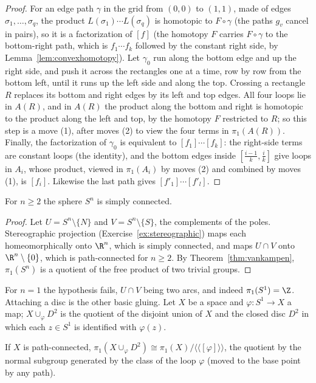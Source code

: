 \begin{proof}
For an edge path $\gamma$ in the grid from $(0,0)$ to $(1,1)$, made of edges $\sigma_1,\dots,\sigma_q$, the product $L(\sigma_1)\cdots L(\sigma_q)$ is homotopic to $F\circ\gamma$ (the paths $g_v$ cancel in pairs),
so it is a factorization of $[f]$ (the homotopy $F$ carries $F\circ\gamma$ to the bottom-right path, which is $f_1\cdots f_k$ followed by the constant right side, by Lemma~\ref{lem:convexhomotopy}). Let $\gamma_0$
run along the bottom edge and up the right side, and push it across the rectangles one at a time, row by row from the bottom left, until it runs up the left side and along the top.
Crossing a rectangle $R$ replaces its bottom and right edges by its left and top edges. All four loops lie in $A(R)$, and in $A(R)$ the product along the bottom and right is homotopic to the
product along the left and top, by the homotopy $F$ restricted to $R$; so this step is a move (1), after moves (2) to view the four terms in $\pi_1(A(R))$. Finally, the factorization of $\gamma_0$
is equivalent to $[f_1]\cdots[f_k]$: the right-side terms are constant loops (the identity), and the bottom edges inside $[\frac{i-1}k,\frac ik]$ give loops in $A_i$, whose product, viewed in $\pi_1(A_i)$
by moves (2) and combined by moves (1), is $[f_i]$. Likewise the last path gives $[f'_1]\cdots[f'_l]$.
\end{proof}

\begin{corollary}\label{cor:spheres}
For $n\ge2$ the sphere $S^n$ is simply connected.
\end{corollary}

\begin{proof}
Let $U=S^n\setminus\{N\}$ and $V=S^n\setminus\{S\}$, the complements of the poles. Stereographic projection (Exercise~\ref{ex:stereographic}) maps each homeomorphically onto $\R^n$, which is simply connected,
and maps $U\cap V$ onto $\R^n\setminus\{0\}$, which is path-connected for $n\ge2$. By Theorem~\ref{thm:vankampen}, $\pi_1(S^n)$ is a quotient of the free product of two trivial groups.
\end{proof}

For $n=1$ the hypothesis fails, $U\cap V$ being two arcs, and indeed $\pi_1(S^1)=\Z$. Attaching a disc is the other basic gluing. Let $X$ be a space and $\varphi\colon S^1\to X$ a map; $X\cup_\varphi D^2$
is the quotient of the disjoint union of $X$ and the closed disc $D^2$ in which each $z\in S^1$ is identified with $\varphi(z)$.

\begin{proposition}\label{prop:attachdisc}
If $X$ is path-connected, $\pi_1(X\cup_\varphi D^2)\cong\pi_1(X)/\langle\langle[\varphi]\rangle\rangle$, the quotient by the normal subgroup generated by the class of the loop $\varphi$ (moved to the base point
by any path).
\end{proposition}


